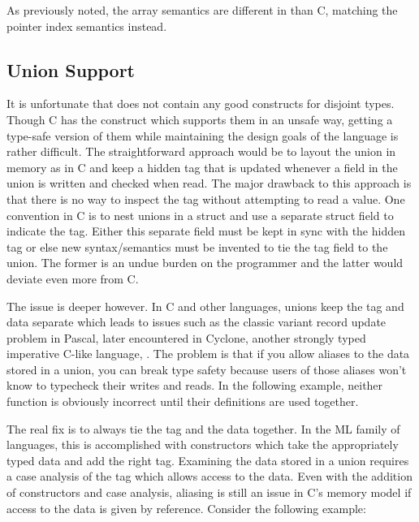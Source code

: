 As previously noted, the array semantics are different in \langname{} than C,
matching the pointer index semantics instead.

\subsection{Union Support}

It is unfortunate that \langname{} does not contain any good constructs for
disjoint types. Though C has the  construct which supports them in an
unsafe way, getting a type-safe version of them while maintaining the design
goals of the language is rather difficult. The straightforward approach would be
to layout the union in memory as in C and keep a hidden tag that is updated
whenever a field in the union is written and checked when read. The major
drawback to this approach is that there is no way to inspect the tag without
attempting to read a value. One convention in C is to nest unions in a struct
and use a separate struct field to indicate the tag. Either this separate field
must be kept in sync with the hidden tag or else new syntax/semantics must be
invented to tie the tag field to the union. The former is an undue burden on the
programmer and the latter would deviate even more from C.

The issue is deeper however. In C and other languages, unions keep the tag and
data separate which leads to issues such as the classic variant record update
problem in Pascal, later encountered in Cyclone, another strongly typed
imperative C-like language, \cite{GrossmanHJM04}. The problem is that if you
allow aliases to the data stored in a union, you can break type safety because
users of those aliases won't know to typecheck their writes and reads.  In the
following example, neither function is obviously incorrect until their
definitions are used together.


The real fix is to always tie the tag and the data together. In the ML family of
languages, this is accomplished with constructors which take the appropriately
typed data and add the right tag. Examining the data stored in a union requires
a case analysis of the tag which allows access to the data. Even with the
addition of constructors and case analysis, aliasing is still an issue in C's
memory model if access to the data is given by reference. Consider the following
example:


